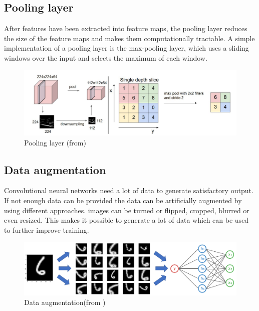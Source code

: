 \subsection{Pooling layer}
After features have been extracted into feature maps,  the pooling layer reduces the 
size of the feature maps and makes them computationally  tractable. A simple implementation 
of a pooling layer is the max-pooling layer, which uses a sliding windows over the input and 
selects the maximum of each window.

\begin{figure}[H]
	\centering
	\includegraphics[width=\linewidth]{bilder/grundlagen/pooling.png}
	\caption{Pooling layer (from\cite{Dao})}
	\label{fig:Pooling}
\end{figure}

\subsection{Data augmentation}
Convolutional neural networks need a lot of data to generate satisfactory output. 
If not enough data can be provided the data can be artificially augmented by using different approaches.
images can be turned or flipped, cropped, blurred or even resized. This makes it 
possible to generate a lot of data which can be used to further improve training.

\begin{figure}[H]
	\centering
	\includegraphics[width=\linewidth]{bilder/deep_learning/data_aug_basic.png}
	\caption{Data augmentation(from  \cite{Ratner2017})}
	\label{fig:COMPONENT}
\end{figure}

